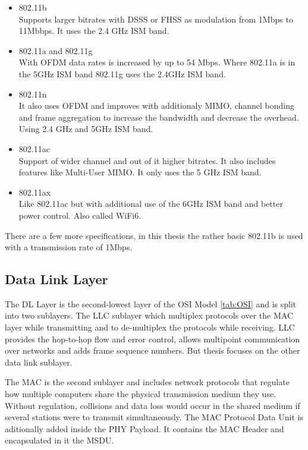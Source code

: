 \begin{itemize}
	\item 802.11b \\
	Supports larger bitrates with \ac{DSSS} or \ac{FHSS} as modulation from 1Mbps to 11Mbbps.
	It uses the 2.4 GHz ISM band.
	\item 802.11a and 802.11g \\
	With \ac{OFDM} data rates is increased by up to 54 Mbps.
	Where 802.11a is in the 5GHz ISM band 802.11g uses the 2.4GHz ISM band.
	\item 802.11n\\
	It also uses \ac{OFDM} and improves with additionaly \ac{MIMO}, channel bonding and frame aggregation to increase the bandwidth and decrease the overhead.
	Using 2.4 GHz and 5GHz ISM band.
	\item 802.11ac\\
	Support of wider channel and out of it higher bitrates. It also includes features like Multi-User MIMO.
	It only uses the 5 GHz ISM band.
	\item 802.11ax\\
	Like 802.11ac but with additional use of the 6GHz ISM band and better power control. 
	Also called WiFi6.
\end{itemize}

There are a few more specifications, in this thesis the rather basic 802.11b is used with a transmission rate of 1Mbps.

\subsection*{Data Link Layer}

The \ac{DL} Layer is the second-lowest layer of the \ac{OSI} Model \ref{tab:OSI} and is split into two sublayers. 
The \ac{LLC} sublayer which multiplex protocols over the MAC layer while transmitting and to de-multiplex the protocols while receiving.
LLC provides the hop-to-hop flow and error control, allows multipoint communication over networks 
and adds frame sequence numbers.
But thesis focuses on the other data link sublayer.

The \ac{MAC} is the second sublayer and 
includes network protocols that regulate how multiple computers share the physical transmission medium they use. 
Without regulation, collisions and data loss would occur in the shared medium if several stations were to transmit simultaneously.
The \ac{MAC} Protocol Data Unit is aditionally added inside the \ac{PHY} Payload. 
It contains the \ac{MAC} Header and encapsulated in it the \ac{MSDU}.


